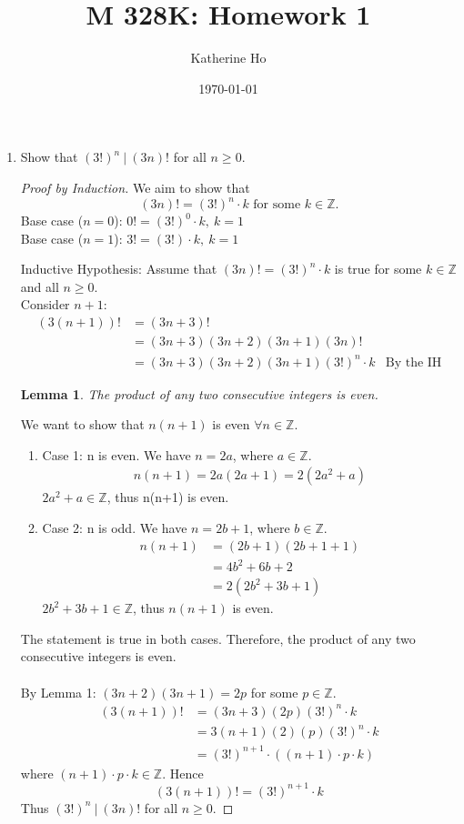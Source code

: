 \documentclass[letterpaper]{article}
\title{M 328K: Homework 1}
\author{Katherine Ho}
\date\today
\newtheorem{lemma}{Lemma}
\begin{document}
\maketitle

\begin{enumerate}
	\item Show that $(3!)^n\ |\ (3n)!$ for all $n\geq0$.
	\begin{proof} [Proof by Induction]
		We aim to show that 
		\[
			(3n)!=(3!)^n\cdot k \text{ for some } k\in\mathbb{Z}.
		\]
		Base case ($n=0$): $0! = (3!)^0\cdot k,\ k = 1$ \\
		Base case ($n=1$): $3! = (3!)\cdot k,\ k = 1 $

		Inductive Hypothesis: Assume that $(3n)!=(3!)^n\cdot k$ is true for some $k\in\mathbb{Z}$
		and all $n\geq 0$. \\
		Consider $n+1$:
		\begin{align*}
			(3(n+1))! &= (3n+3)! \\
			&= (3n+3)(3n+2)(3n+1)(3n)! \\
			&= (3n+3)(3n+2)(3n+1)(3!)^n\cdot k & \text{By the IH}
		\end{align*}

		\begin{lemma}
			The product of any two consecutive integers is even.
		\end{lemma}
			We want to show that $n(n+1)$ is even $\forall n \in \mathbb{Z}$.
			\begin{enumerate}
				\item Case 1: n is even.
				We have $n=2a$, where $a\in\mathbb{Z}$.
				\begin{equation*} \begin{split}
					n(n+1) = 2a(2a+1) 
					= 2(2a^2+a)
				\end{split} \end{equation*}
				$2a^2+a\in\mathbb{Z}$, thus n(n+1) is even.
				\item Case 2: n is odd.
				We have $n=2b+1$, where $b\in\mathbb{Z}$.
				\begin{equation*}
					\begin{split}
						n(n+1) 
						& = (2b+1)(2b+1+1) \\
						& = 4b^2+6b+2 \\
						& = 2(2b^2+3b+1)
					\end{split}
				\end{equation*}
				$2b^2+3b+1\in\mathbb{Z}$, thus $n(n+1)$ is even.
			\end{enumerate}
			The statement is true in both cases. 
			Therefore, the product of any two consecutive integers is even.\\\\
		By Lemma 1: $(3n+2)(3n+1)=2p$ for some $p\in\mathbb{Z}$.
		\begin{align*}
			(3(n+1))! &= (3n+3)(2p)(3!)^n\cdot k \\
			&= 3(n+1)(2)(p)(3!)^n\cdot k \\
			&= (3!)^{n+1}\cdot ((n+1)\cdot p\cdot k)
		\end{align*}
		where $(n+1)\cdot p\cdot k\in\mathbb{Z}$. Hence
		\[
			(3(n+1))! = (3!)^{n+1}\cdot k
		\]
		Thus $(3!)^n\ |\ (3n)!$ for all $n\geq0$.
			

\end{proof}
\end{enumerate}
\end{document}
